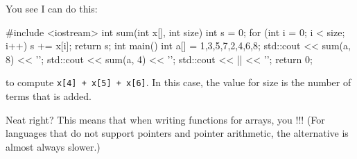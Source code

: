 You see I can do this:

\begin{consolethree}[escapeinside=||]
#include <iostream>
int sum(int x[], int size)
{
    int s = 0;
    for (int i = 0; i < size; i++)
    {
        s += x[i];
    }
    return s;
}
int main()
{
    int a[] = {1,3,5,7,2,4,6,8};
    std::cout << sum(a, 8) << '\n';
    std::cout << sum(a, 4) << '\n';
    std::cout << || << '\n';
    return 0;
}
\end{consolethree}

to compute \texttt{x[4] + x[5] + x[6]}. In this case, the value for size is the number of terms that is added.

Neat right? This means that when writing functions for arrays, you !!! (For languages that do not support pointers and pointer arithmetic, the alternative is almost always slower.)




